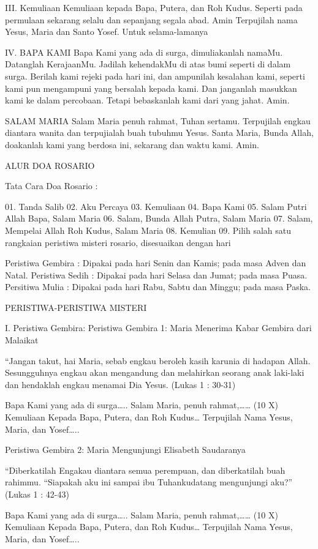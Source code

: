 \documentclass[a5paper,headsepline,titlepage,11pt,nnormalheadings,DIVcalc]{scrbook}
\begin{document}
III. Kemuliaan
Kemuliaan kepada Bapa, Putera, dan Roh Kudus. Seperti pada permulaan sekarang selalu dan sepanjang segala abad. Amin
Terpujilah nama Yesus, Maria dan Santo Yosef. Untuk selama-lamanya

IV. BAPA KAMI
Bapa Kami yang ada di surga, dimuliakanlah namaMu. Datanglah KerajaanMu. Jadilah kehendakMu di atas bumi seperti di dalam surga. Berilah kami rejeki pada hari ini, dan ampunilah kesalahan kami, seperti kami pun mengampuni yang bersalah kepada kami. Dan janganlah masukkan kami ke dalam percobaan. Tetapi bebaskanlah kami dari yang jahat. Amin.

SALAM MARIA
Salam Maria penuh rahmat, Tuhan sertamu. Terpujilah engkau diantara wanita dan terpujialah buah tubuhmu Yesus. Santa Maria, Bunda Allah, doakanlah kami yang berdosa ini, sekarang dan waktu kami. Amin.


ALUR DOA ROSARIO

Tata Cara Doa Rosario :

01. Tanda Salib
02. Aku Percaya
03. Kemuliaan
04. Bapa Kami
05. Salam Putri Allah Bapa, Salam Maria
06. Salam, Bunda Allah Putra, Salam Maria
07. Salam, Mempelai Allah Roh Kudus, Salam Maria
08. Kemulian
09. Pilih salah satu rangkaian peristiwa misteri rosario, disesuaikan dengan hari

    Peristiwa Gembira : Dipakai pada hari Senin dan Kamis; pada masa Adven dan Natal.
    Peristiwa Sedih : Dipakai pada hari Selasa dan Jumat; pada masa Puasa.
    Persitiwa Mulia : Dipakai pada hari Rabu, Sabtu dan Minggu; pada masa Paska.

PERISTIWA-PERISTIWA MISTERI

I. Peristiwa Gembira:
	Peristiwa Gembira 1: Maria Menerima Kabar Gembira dari Malaikat

“Jangan takut, hai Maria, sebab engkau beroleh kasih karunia di hadapan Allah. Sesungguhnya engkau akan mengandung dan melahirkan seorang anak laki-laki dan hendaklah engkau menamai Dia Yesus.
(Lukas 1 : 30-31)

Bapa Kami yang ada di surga…..
Salam Maria, penuh rahmat,…… (10 X)
Kemuliaan Kepada Bapa, Putera, dan Roh Kudus…
Terpujilah Nama Yesus, Maria, dan Yosef…..

	Peristiwa Gembira 2: Maria Mengunjungi Elisabeth Saudaranya

“Diberkatilah Engakau diantara semua perempuan, dan diberkatilah buah rahimmu.
“Siapakah aku ini sampai ibu Tuhankudatang mengunjungi aku?”
(Lukas 1 : 42-43)

Bapa Kami yang ada di surga…..
Salam Maria, penuh rahmat,…… (10 X)
Kemuliaan Kepada Bapa, Putera, dan Roh Kudus…
Terpujilah Nama Yesus, Maria, dan Yosef…..
\end{document}
